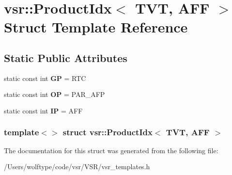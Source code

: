 \hypertarget{structvsr_1_1_product_idx_3_01_t_v_t_00_01_a_f_f_01_4}{\section{vsr\-:\-:Product\-Idx$<$ T\-V\-T, A\-F\-F $>$ Struct Template Reference}
\label{structvsr_1_1_product_idx_3_01_t_v_t_00_01_a_f_f_01_4}
}
\subsection*{Static Public Attributes}
\begin{DoxyCompactItemize}
\item 
\hypertarget{structvsr_1_1_product_idx_3_01_t_v_t_00_01_a_f_f_01_4_accca29a241d5f0fc94dbd7d0212e7b71}{static const int {\bfseries G\-P} = R\-T\-C}\label{structvsr_1_1_product_idx_3_01_t_v_t_00_01_a_f_f_01_4_accca29a241d5f0fc94dbd7d0212e7b71}

\item 
\hypertarget{structvsr_1_1_product_idx_3_01_t_v_t_00_01_a_f_f_01_4_a58587a2ae875ebe96937bea3295e0917}{static const int {\bfseries O\-P} = P\-A\-R\-\_\-\-A\-F\-P}\label{structvsr_1_1_product_idx_3_01_t_v_t_00_01_a_f_f_01_4_a58587a2ae875ebe96937bea3295e0917}

\item 
\hypertarget{structvsr_1_1_product_idx_3_01_t_v_t_00_01_a_f_f_01_4_adeb1fd5e807608f76704cb7922e4def9}{static const int {\bfseries I\-P} = A\-F\-F}\label{structvsr_1_1_product_idx_3_01_t_v_t_00_01_a_f_f_01_4_adeb1fd5e807608f76704cb7922e4def9}

\end{DoxyCompactItemize}
\subsubsection*{template$<$$>$ struct vsr\-::\-Product\-Idx$<$ T\-V\-T, A\-F\-F $>$}



The documentation for this struct was generated from the following file\-:\begin{DoxyCompactItemize}
\item 
/\-Users/wolftype/code/vsr/\-V\-S\-R/vsr\-\_\-templates.\-h\end{DoxyCompactItemize}
